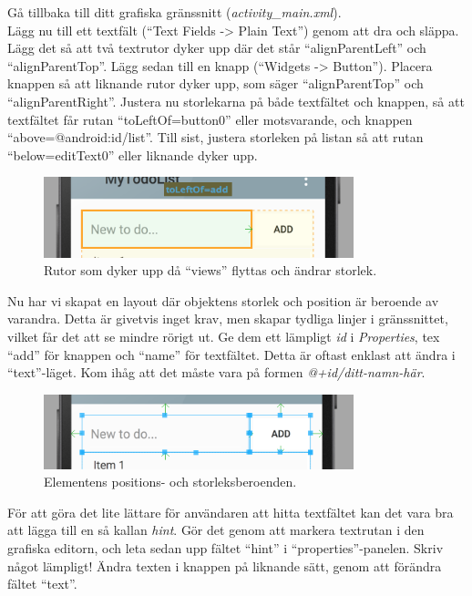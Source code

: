 \documentclass[11 pt, titlepage]{article} %
\begin{document}
Gå tillbaka till ditt grafiska gränssnitt (\textit{activity\_main.xml}).\\
Lägg nu till ett textfält (``Text Fields -> Plain Text'') genom att dra och släppa. Lägg det så att två textrutor dyker upp där det står ``alignParentLeft'' och ``alignParentTop''.
Lägg sedan till en knapp (``Widgets -> Button'').
Placera knappen så att liknande rutor dyker upp, som säger ``alignParentTop'' och ``alignParentRight''.
Justera nu storlekarna på både textfältet och knappen, så att textfältet får rutan ``toLeftOf=button0'' eller motsvarande, och knappen ``above=@android:id/list''.
Till sist, justera storleken på listan så att rutan ``below=editText0'' eller liknande dyker upp.\\

\begin{figure}[ht!]
\centering
\includegraphics[width=90mm]{images/editing_layout.png}
\caption{Rutor som dyker upp då ``views'' flyttas och ändrar storlek.}
\label{overflow}
\end{figure}

Nu har vi skapat en layout där objektens storlek och position är beroende av varandra.
Detta är givetvis inget krav, men skapar tydliga linjer i gränssnittet, vilket får det att se mindre rörigt ut.
Ge dem ett lämpligt \textit{id} i \textit{Properties}, tex ``add'' för knappen och ``name'' för textfältet. Detta är oftast enklast att ändra i ``text''-läget.
Kom ihåg att det måste vara på formen \textit{@+id/ditt-namn-här}.\\

\begin{figure}[ht!]
\centering
\includegraphics[width=90mm]{images/layout.png}
\caption{Elementens positions- och storleksberoenden.}
\label{overflow}
\end{figure}

För att göra det lite lättare för användaren att hitta textfältet kan det vara bra att lägga till en så kallan \textit{hint}.
Gör det genom att markera textrutan i den grafiska editorn, och leta sedan upp fältet ``hint'' i ``properties''-panelen.
Skriv något lämpligt!
Ändra texten i knappen på liknande sätt, genom att förändra fältet ``text''. \\
\end{document}
